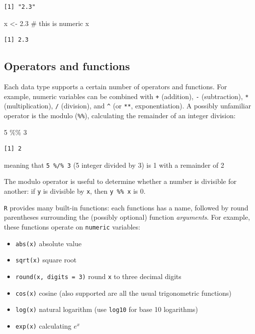 \documentclass[
  letterpaper,
  DIV=11,
  numbers=noendperiod]{scrreprt}
\newenvironment{Shaded}{\begin{snugshade}}{\end{snugshade}}
\newcommand{\CommentTok}[1]{\textcolor[rgb]{0.37,0.37,0.37}{#1}}
\newcommand{\DecValTok}[1]{\textcolor[rgb]{0.68,0.00,0.00}{#1}}
\newcommand{\FloatTok}[1]{\textcolor[rgb]{0.68,0.00,0.00}{#1}}
\newcommand{\NormalTok}[1]{\textcolor[rgb]{0.00,0.23,0.31}{#1}}
\newcommand{\OtherTok}[1]{\textcolor[rgb]{0.00,0.23,0.31}{#1}}
\newcommand{\SpecialCharTok}[1]{\textcolor[rgb]{0.37,0.37,0.37}{#1}}
\providecommand{\tightlist}{%
  \setlength{\itemsep}{0pt}\setlength{\parskip}{0pt}}\usepackage{longtable,booktabs,array}
\begin{document}
\begin{verbatim}
[1] "2.3"
\end{verbatim}

\begin{Shaded}
\begin{Highlighting}[]
\NormalTok{x }\OtherTok{\textless{}{-}} \FloatTok{2.3} \CommentTok{\# this is numeric}
\NormalTok{x}
\end{Highlighting}
\end{Shaded}

\begin{verbatim}
[1] 2.3
\end{verbatim}

\hypertarget{operators-and-functions}{%
\subsection{Operators and functions}\label{operators-and-functions}}

Each data type supports a certain number of operators and functions. For
example, numeric variables can be combined with \texttt{+} (addition),
\texttt{-} (subtraction), \texttt{*} (multiplication), \texttt{/}
(division), and \texttt{\^{}} (or \texttt{**}, exponentiation). A
possibly unfamiliar operator is the modulo (\texttt{\%\%}), calculating
the remainder of an integer division:

\begin{Shaded}
\begin{Highlighting}[]
\DecValTok{5} \SpecialCharTok{\%\%} \DecValTok{3}
\end{Highlighting}
\end{Shaded}

\begin{verbatim}
[1] 2
\end{verbatim}

meaning that \texttt{5\ \%/\%\ 3} (5 integer divided by 3) is 1 with a
remainder of 2

The modulo operator is useful to determine whether a number is divisible
for another: if \texttt{y} is divisible by \texttt{x}, then
\texttt{y\ \%\%\ x} is 0.

\texttt{R} provides many built-in functions: each functions has a name,
followed by round parentheses surrounding the (possibly optional)
function \emph{arguments}. For example, these functions operate on
\texttt{numeric} variables:

\begin{itemize}
\tightlist
\item
  \texttt{abs(x)} absolute value
\item
  \texttt{sqrt(x)} square root
\item
  \texttt{round(x,\ digits\ =\ 3)} round \texttt{x} to three decimal
  digits
\item
  \texttt{cos(x)} cosine (also supported are all the usual trigonometric
  functions)
\item
  \texttt{log(x)} natural logarithm (use \texttt{log10} for base 10
  logarithms)
\item
  \texttt{exp(x)} calculating \(e^x\)
\end{itemize}
\end{document}

